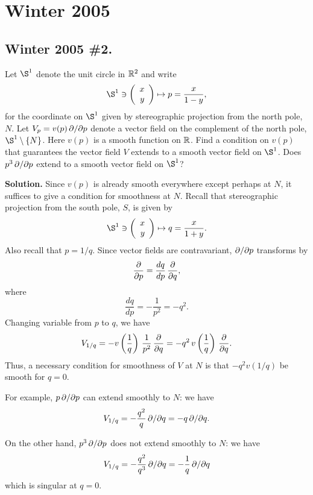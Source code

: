 \documentclass[10pt]{article}
\numberwithin{equation}{subsection}
\begin{document}

\newpage
\section{Winter 2005}

\subsection{Winter 2005 \#2.}
\label{sec:W05.2}

Let $\S^1$ denote the unit circle in $\mathbb{R}^2$ and write
$$
	\S^1 \ni \colvectwo{x}{y} \mapsto p = \frac{x}{1-y},
$$
for the coordinate on $\S^1$ given by stereographic projection from the north
pole, $N$.  Let $V_p = v(p)\,\partial/\partial p$ denote a vector field on the complement of
the north pole, $\S^1 \setminus \{N\}$.  Here $v(p)$ is a smooth function on
$\mathbb{R}$.  Find a condition on $v(p)$ that guarantees the vector field $V$ extends
to a smooth vector field on $\S^1$.  Does $p^3 \,\partial/\partial p$ extend to a smooth
vector field on $\S^1$?

\textbf{Solution.}  Since $v(p)$ is already smooth everywhere except perhaps at
$N$, it suffices to give a condition for smoothness at $N$.  Recall that
stereographic projection from the south pole, $S$, is given by 
$$
	\S^1 \ni \colvectwo{x}{y} \mapsto q = \frac{x}{1+y}.
$$
Also recall that $p=1/q$.  Since vector fields are contravariant, $\partial/\partial p$
transforms by
$$
	\frac{\partial}{\partial p} = \frac{dq}{dp} \,\frac{\partial}{\partial q},
$$
where
$$
	\frac{dq}{dp} = -\frac{1}{p^2} = -q^2.
$$
Changing variable from $p$ to $q$, we have
$$
	V_{1/q} =  - v\left(\frac{1}{q}\right) \,\frac{1}{p^2}\, \frac{\partial}{\partial q}
		= - q^2\, v\left(\frac{1}{q}\right) \, \frac{\partial}{\partial q}.
$$
Thus, a necessary condition for smoothness of $V$ at $N$ is that
$-q^2 v(1/q)$ be smooth for $q=0$.

For example, $p\,\partial/\partial p$ can extend smoothly to $N$:
we have
$$
	V_{1/q} = -\frac{q^2}{q} \,\partial/\partial q = -q \,\partial/\partial q.
$$

On the other hand, $p^3\,\partial/\partial p$ does not extend smoothly to $N$:
we have
$$
	V_{1/q}
	= -\frac{q^2}{q^3} \,\partial/\partial q
	= -\frac{1}{q} \,\partial/\partial q
$$
which is singular at $q=0$.

\end{document}
